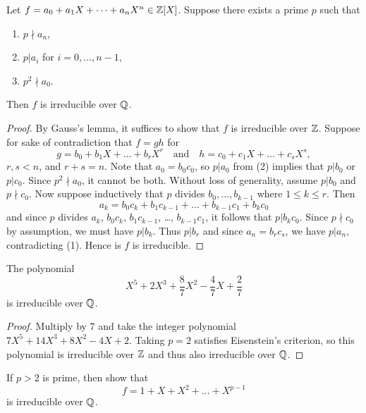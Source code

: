 \begin{theorem}
  Let $f = a_0 + a_1 X + \dots + a_n X^n \in \mathbb{Z}[X]$.
  Suppose there exists a prime $p$ such that
  \begin{enumerate}
    \item $p {\nmid} a_n$,
    \item $p | a_i$ for $i = 0, \dots, n - 1$,
    \item $p^2 {\nmid} a_0$.
  \end{enumerate}
  Then $f$ is irreducible over $\mathbb{Q}$.
\end{theorem}

\begin{proof}
  By Gauss's lemma, it suffices to show that $f$ is
  irreducible over $\mathbb{Z}$. Suppose for sake of contradiction
  that $f = gh$ for
  \[
    g = b_0 + b_1 X + \dots + b_r X^r \quad \text{and} \quad
    h = c_0 + c_1 X + \dots + c_s X^s,
  \]
  $r, s < n$, and $r + s = n$. Note that
  $a_0 = b_0 c_0$, so $p | a_0$ from (2) implies that
  $p | b_0$ or $p | c_0$. Since $p^2 {\nmid} a_0$,
  it cannot be both. Without loss of generality, assume
  $p | b_0$ and $p {\nmid} c_0$. Now suppose inductively
  that $p$ divides $b_0, \dots, b_{k - 1}$ where
  $1 \le k \le r$. Then
  \[a_k = b_0 c_k + b_1 c_{k - 1} + \dots + b_{k - 1} c_1 + b_k c_0\]
  and since $p$ divides $a_k$, $b_0 c_k$,
  $b_1 c_{k - 1}$, \dots, $b_{k - 1} c_1$, it follows that
  $p | b_k c_0$. Since $p {\nmid} c_0$ by assumption, we
  must have $p | b_k$. Thus
  $p | b_r$ and since $a_n = b_r c_s$, we have
  $p | a_n$, contradicting (1). Hence is $f$ is
  irreducible.
\end{proof}

\begin{example}
  The polynomial
  \[
    X^5 + 2X^3 + \frac{8}{7} X^2 - \frac{4}{7} X + \frac{2}{7}
  \]
  is irreducible over $\mathbb{Q}$.
\end{example}

\begin{proof}
  Multiply by $7$ and take the integer polynomial
  $7X^5 + 14X^3 + 8X^2 - 4X + 2$. Taking
  $p = 2$ satisfies Eisenstein's criterion, so this
  polynomial is irreducible over $\mathbb{Z}$ and thus also
  irreducible over $\mathbb{Q}$.
\end{proof}

\begin{example}
  If $p > 2$ is prime, then show that
  \[f = 1 + X + X^2 + \dots + X^{p - 1}\]
  is irreducible over $\mathbb{Q}$.
\end{example}

